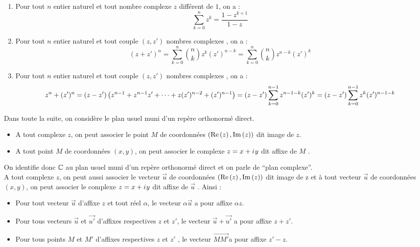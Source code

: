 \begin{defprop}
	\begin{enumerate}
		\item Pour tout \(n\) entier naturel et tout nombre complexe \(z\) différent de \(1\), on a :
		      \[\sum_{k=0}^n z^k = \frac{1-z^{k+1}}{1-z}\]
		\item Pour tout \(n\) entier naturel et tout couple \((z,z')\) nombres complexes , on a :
		      \[(z+z')^n = \sum_{k=0}^{n}\binom{n}{k}z^k(z')^{n-k} = \sum_{k=0}^{n}\binom{n}{k}z^{n-k}(z')^k\]
		\item Pour tout \(n\) entier naturel et tout couple \((z,z')\) nombres complexes , on a :
		      \[z^n+(z')^n = (z-z')\left(z^{n-1}+z^{n-1}z'+\dots+z(z')^{n-2}+(z')^{n-1}\right) = (z-z')\sum_{k=0}^{n-1} z^{n-1-k}(z')^{k} =(z-z')\sum_{k=0}^{n-1} z^{k}(z')^{n-1-k} \]
	\end{enumerate}
\end{defprop}

\begin{defprop}
	Dans toute la suite, on considère le plan usuel muni d’un repère orthonormé direct.
	\begin{itemize}
		\item A tout complexe \(z\), on peut associer le point \(M\) de coordonnées \((\operatorname{Re}\left(z\right), \operatorname{Im}\left(z\right))\) dit image de \(z\).
		\item A tout point \(M\) de coordonnées \((x, y)\), on peut associer le complexe \(z = x + i\mkern1mu y\) dit affixe de \(M\) .
	\end{itemize}
	On identifie donc \(\mathbb{C}\) au plan usuel muni d’un repère orthonormé direct et on parle de “plan complexe”. \\

	A tout complexe \(z\), on peut aussi associer le vecteur \(\vec{u}\) de coordonnées \((\operatorname{Re}\left(z\right), \operatorname{Im}\left(z\right))\) dit image de z et à tout vecteur  \(\vec{u}\) de coordonnées \((x, y)\), on peut associer le complexe \( z = x + i\mkern1mu y\) dit affixe de  \(\vec{u}\) . Ainsi :
	\begin{itemize}
		\item Pour tout vecteur  \(\vec{u}\) d’affixe \(z\) et tout réel \(\alpha\), le vecteur \(\alpha \vec{u}\) a pour affixe \(\alpha z\). \\
		\item Pour tous vecteurs \(\vec{u}\) et \(\vec{u'}\) d’affixes respectives \(z\) et \(z'\), le vecteur \(\vec{u} + \vec{u'} \) a pour affixe \(z + z'\). \\
		\item Pour tous points \(M\) et \(M '\) d’affixes respectives \(z\) et \(z'\) , le vecteur \(\vec{MM'}\)a pour affixe \(z' - z\).
	\end{itemize}
\end{defprop}


